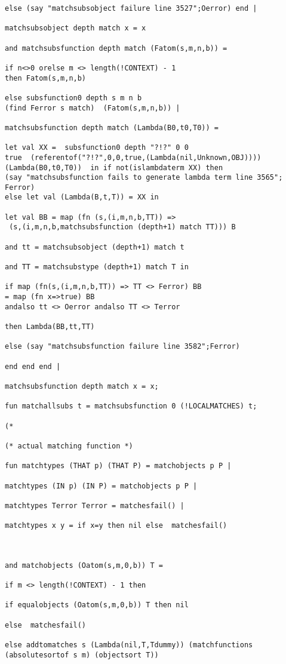 \documentclass[12pt]{article}
\begin{document}
\begin{verbatim}
else (say "matchsubsobject failure line 3527";Oerror) end |

matchsubsobject depth match x = x

and matchsubsfunction depth match (Fatom(s,m,n,b)) =

if n<>0 orelse m <> length(!CONTEXT) - 1 
then Fatom(s,m,n,b)

else subsfunction0 depth s m n b 
(find Ferror s match)  (Fatom(s,m,n,b)) |

matchsubsfunction depth match (Lambda(B0,t0,T0)) =

let val XX =  subsfunction0 depth "?!?" 0 0 
true  (referentof("?!?",0,0,true,(Lambda(nil,Unknown,OBJ))))
(Lambda(B0,t0,T0))  in if not(islambdaterm XX) then  
(say "matchsubsfunction fails to generate lambda term line 3565";
Ferror)
else let val (Lambda(B,t,T)) = XX in

let val BB = map (fn (s,(i,m,n,b,TT)) =>
 (s,(i,m,n,b,matchsubsfunction (depth+1) match TT))) B

and tt = matchsubsobject (depth+1) match t

and TT = matchsubstype (depth+1) match T in

if map (fn(s,(i,m,n,b,TT)) => TT <> Ferror) BB 
= map (fn x=>true) BB
andalso tt <> Oerror andalso TT <> Terror

then Lambda(BB,tt,TT)

else (say "matchsubsfunction failure line 3582";Ferror)

end end end |

matchsubsfunction depth match x = x;

fun matchallsubs t = matchsubsfunction 0 (!LOCALMATCHES) t;

(*

(* actual matching function *)

fun matchtypes (THAT p) (THAT P) = matchobjects p P |

matchtypes (IN p) (IN P) = matchobjects p P |

matchtypes Terror Terror = matchesfail() |

matchtypes x y = if x=y then nil else  matchesfail()



and matchobjects (Oatom(s,m,0,b)) T = 

if m <> length(!CONTEXT) - 1 then

if equalobjects (Oatom(s,m,0,b)) T then nil

else  matchesfail()

else addtomatches s (Lambda(nil,T,Tdummy)) (matchfunctions 
(absolutesortof s m) (objectsort T))


\end{verbatim}
\end{document}
